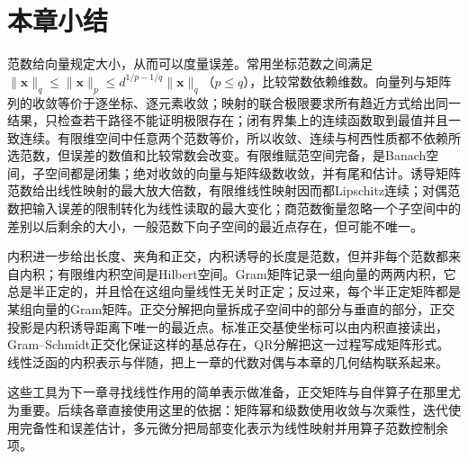 \section{本章小结}
\label{sec:ls-normed-inner-product-summary}

范数给向量规定大小，从而可以度量误差。常用坐标范数之间满足$\lVert\bm x\rVert_q\leq\lVert\bm x\rVert_p\leq d^{1/p-1/q}\lVert\bm x\rVert_q$（$p\leq q$），比较常数依赖维数。向量列与矩阵列的收敛等价于逐坐标、逐元素收敛；映射的联合极限要求所有趋近方式给出同一结果，只检查若干路径不能证明极限存在；闭有界集上的连续函数取到最值并且一致连续。有限维空间中任意两个范数等价，所以收敛、连续与柯西性质都不依赖所选范数，但误差的数值和比较常数会改变。有限维赋范空间完备，是Banach空间，子空间都是闭集；绝对收敛的向量与矩阵级数收敛，并有尾和估计。诱导矩阵范数给出线性映射的最大放大倍数，有限维线性映射因而都Lipschitz连续；对偶范数把输入误差的限制转化为线性读取的最大变化；商范数衡量忽略一个子空间中的差别以后剩余的大小，一般范数下向子空间的最近点存在，但可能不唯一。

内积进一步给出长度、夹角和正交，内积诱导的长度是范数，但并非每个范数都来自内积；有限维内积空间是Hilbert空间。Gram矩阵记录一组向量的两两内积，它总是半正定的，并且恰在这组向量线性无关时正定；反过来，每个半正定矩阵都是某组向量的Gram矩阵。正交分解把向量拆成子空间中的部分与垂直的部分，正交投影是内积诱导距离下唯一的最近点。标准正交基使坐标可以由内积直接读出，Gram--Schmidt正交化保证这样的基总存在，QR分解把这一过程写成矩阵形式。线性泛函的内积表示与伴随，把上一章的代数对偶与本章的几何结构联系起来。

这些工具为下一章寻找线性作用的简单表示做准备，正交矩阵与自伴算子在那里尤为重要。后续各章直接使用这里的依据：矩阵幂和级数使用收敛与次乘性，迭代使用完备性和误差估计，多元微分把局部变化表示为线性映射并用算子范数控制余项。

